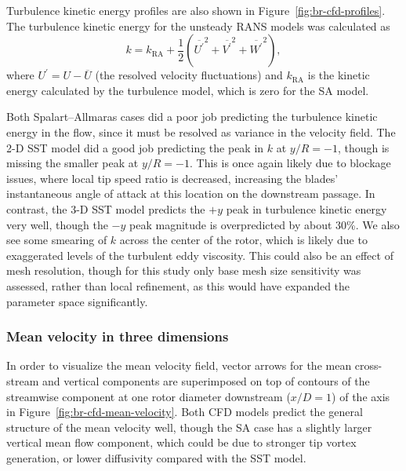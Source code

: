 \documentclass[aip,graphicx]{revtex4-1}
\begin{document}
Turbulence kinetic energy profiles are also shown in
Figure~\ref{fig:br-cfd-profiles}. The turbulence kinetic energy for the unsteady
RANS models was calculated as
\begin{equation}
    k = k_{\mathrm{RA}} + \frac{1}{2} \left(
    \overline{U^\prime}^2 +
    \overline{V^\prime}^2 +
    \overline{W^\prime}^2 \right),
    \label{eq:k}
\end{equation}
where $U^\prime = U - \overline{U}$ (the resolved velocity fluctuations) and
$k_{\mathrm{RA}}$ is the kinetic energy calculated by the turbulence model,
which is zero for the SA model.

Both Spalart--Allmaras cases did a poor job predicting the turbulence kinetic
energy in the flow, since it must be resolved as variance in the velocity field.
The 2-D SST model did a good job predicting the peak in $k$ at $y/R=-1$, though
is missing the smaller peak at $y/R=-1$. This is once again likely due to
blockage issues, where local tip speed ratio is decreased, increasing the
blades' instantaneous angle of attack at this location on the downstream
passage. In contrast, the 3-D SST model predicts the $+y$ peak in turbulence
kinetic energy very well, though the $-y$ peak magnitude is overpredicted by
about 30\%. We also see some smearing of $k$ across the center of the rotor,
which is likely due to exaggerated levels of the turbulent eddy viscosity. This
could also be an effect of mesh resolution, though for this study only base mesh
size sensitivity was assessed, rather than local refinement, as this would have
expanded the parameter space significantly.


\subsubsection{Mean velocity in three dimensions}

In order to visualize the mean velocity field, vector arrows for the mean
cross-stream and vertical components are superimposed on top of contours of the
streamwise component at one rotor diameter downstream ($x/D=1$) of the axis in
Figure~\ref{fig:br-cfd-mean-velocity}. Both CFD models predict the general
structure of the mean velocity well, though the SA case has a slightly larger
vertical mean flow component, which could be due to stronger tip vortex
generation, or lower diffusivity compared with the SST model.
\end{document}
